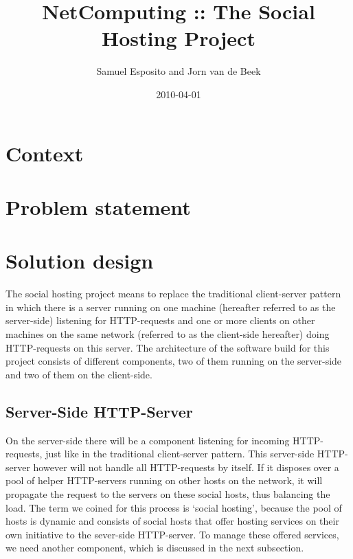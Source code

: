\documentclass[a4paper, 10pt]{article}
\title{NetComputing :: The Social Hosting Project}
\author{Samuel Esposito and Jorn van de Beek}
\date{2010-04-01}
\begin{document}
\ifpdf
{}
\else
{}
\fi

\maketitle

\section{Context}

\section{Problem statement}

\section{Solution design}

The social hosting project means to replace the traditional client-server pattern in which there is a server running on one machine (hereafter referred to as the server-side) listening for HTTP-requests and one or more clients on other machines on the same network (referred to as the client-side hereafter) doing HTTP-requests on this server. The architecture of the software build for this project consists of different components, two of them running on the server-side and two of them on the client-side. 

\subsection{Server-Side HTTP-Server}
On the server-side there will be a component listening for incoming HTTP-requests, just like in the traditional client-server pattern. This server-side HTTP-server however will not handle all HTTP-requests by itself. If it disposes over a pool of helper HTTP-servers running on other hosts on the network, it will propagate the request to the servers on these social hosts, thus balancing the load. The term we coined for this process is `social hosting', because the pool of hosts is dynamic and consists of social hosts that offer hosting services on their own initiative to the sever-side HTTP-server. To manage these offered services, we need another component, which is discussed in the next subsection.
\end{document}
